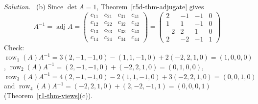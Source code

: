 \documentclass[12pt]{article}
\DeclareMathOperator{\row}{row}
\theoremstyle{definition}
\newenvironment{solution}{\par\noindent\textit{Solution.}\ }{\par\smallskip}
\begin{document}
\begin{solution}
(b) Since \(\det A=1\), Theorem~\ref{r5d-thm-adjugate} gives
\[
A^{-1}=\operatorname{adj}A=\begin{pmatrix}c_{11}&c_{21}&c_{31}&c_{41}\\c_{12}&c_{22}&c_{32}&c_{42}\\c_{13}&c_{23}&c_{33}&c_{43}\\c_{14}&c_{24}&c_{34}&c_{44}\end{pmatrix}
=\begin{pmatrix}2&-1&-1&0\\1&1&-1&0\\-2&2&1&0\\2&-2&-1&1\end{pmatrix}
\]
Check: \(\row_1(A)A^{-1}=3(2,-1,-1,0)-(1,1,-1,0)+2(-2,2,1,0)=(1,0,0,0)\),
\(\row_2(A)A^{-1}=(2,-1,-1,0)+(-2,2,1,0)=(0,1,0,0)\), \(\row_3(A)A^{-1}=4(2,-1,-1,0)-2(1,1,-1,0)+3(-2,2,1,0)=(0,0,1,0)\)
and \(\row_4(A)A^{-1}=(-2,2,1,0)+(2,-2,-1,1)=(0,0,0,1)\) (Theorem~\ref{r1-thm-views}(c)).


\end{solution}
\end{document}
